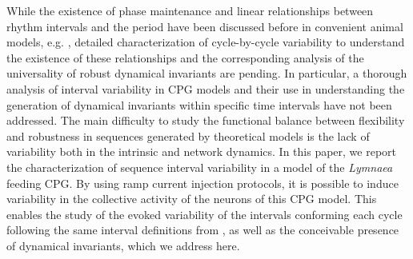 While the existence of phase maintenance and linear relationships between rhythm intervals and the period have been discussed before in convenient animal models, e.g. \cite{grillner_generation_1976,Hooper1997a,vavoulis_dynamic_2007}, detailed characterization of cycle-by-cycle variability to understand the existence of these relationships and the corresponding analysis of the universality of robust dynamical invariants are pending.
In particular, a thorough analysis of interval variability in CPG models and their use in understanding the generation of dynamical invariants within specific time intervals have not been addressed. The main difficulty to study the functional balance between flexibility and robustness in sequences generated by theoretical models is the lack of variability both in the intrinsic and network dynamics. In this paper, we report the characterization of sequence interval variability in a model of the \textit{Lymnaea} feeding CPG.  By using ramp current injection protocols, it is possible to induce variability in the collective activity of the neurons of this CPG model. This enables the study of the evoked variability of the intervals conforming each cycle following the same interval definitions from \cite{elices_robust_2019}, as well as the conceivable presence of dynamical invariants, which we address here. 

